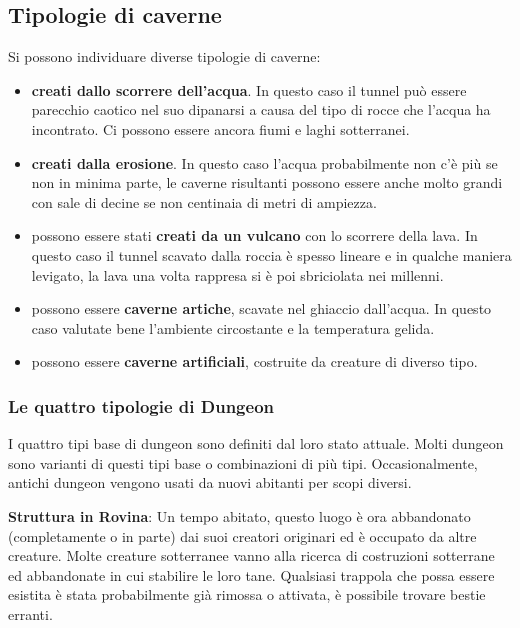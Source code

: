 \begin{multicols}{2}
\subsection{Tipologie di caverne}

Si possono individuare diverse tipologie di caverne:

\begin{itemize}[leftmargin=*] \setlength{\itemsep}{0pt}

\item \textbf{creati dallo scorrere dell'acqua}. In questo caso il tunnel può essere parecchio caotico nel suo dipanarsi a causa del tipo di rocce che l'acqua ha incontrato. Ci possono essere ancora fiumi e laghi sotterranei.

\item \textbf{creati dalla erosione}. In questo caso l'acqua probabilmente non c'è più se non in minima parte, le caverne risultanti possono essere anche molto grandi con sale di decine se non centinaia di metri di ampiezza.

\item possono essere stati \textbf{creati da un vulcano} con lo scorrere della lava. In questo caso il tunnel scavato dalla roccia è spesso lineare e in qualche maniera levigato, la lava una volta rappresa si è poi sbriciolata nei millenni.

\item possono essere \textbf{caverne artiche}, scavate nel ghiaccio dall'acqua. In questo caso valutate bene l'ambiente circostante e la temperatura gelida.

\item possono essere \textbf{caverne artificiali}, costruite da creature di diverso tipo.

\end{itemize}

\subsubsection{Le quattro tipologie di Dungeon}

I quattro tipi base di dungeon sono definiti dal loro stato attuale. Molti dungeon sono varianti di questi tipi base o combinazioni di più tipi. Occasionalmente, antichi dungeon vengono usati da nuovi abitanti per scopi diversi.

\textbf{Struttura in Rovina}: Un tempo abitato, questo luogo è ora abbandonato (completamente o in parte) dai suoi creatori originari ed è occupato da altre creature. Molte creature sotterranee vanno alla ricerca di costruzioni sotterrane ed abbandonate in cui stabilire le loro tane. Qualsiasi trappola che possa essere esistita è stata probabilmente già rimossa o attivata, è possibile trovare bestie erranti.


\end{multicols}
